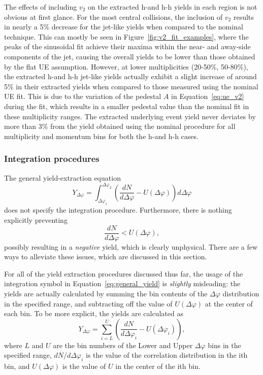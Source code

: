 The effects of including $v_{2}$ on the extracted h-\lmb and h-h yields in each region is not obvious at first glance. For the most central collisions, the inclusion of $v_{2}$ results in nearly a 5\% decrease for the jet-like yields when compared to the nominal technique. This can mostly be seen in Figure~\ref{fig:v2_fit_examples}, where the peaks of the sinusoidal fit achieve their maxima within the near- and away-side components of the jet, causing the overall yields to be lower than those obtained by the flat UE assumption. However, at lower multiplicities (20-50\%, 50-80\%), the extracted h-\lmb and h-h jet-like yields actually exhibit a slight increase of around 5\% in their extracted yields when compared to those measured using the nominal UE fit. This is due to the variation of the pedestal $A$ in Equation~\ref{eq:ue_v2} during the fit, which results in a smaller pedestal value than the nominal fit in these multiplicity ranges. The extracted underlying event yield never deviates by more than 3\% from the yield obtained using the nominal procedure for all multiplicity and momentum bins for both the h-\lmb and h-h cases.

\subsubsection{Integration procedures}
\label{sec:integration_procedures}

The general yield-extraction equation
%
\begin{equation}
    \label{eq:general_yield}
    Y_{\Delta\varphi} = \int_{\Delta\varphi_1}^{\Delta\varphi_2} (\frac{dN}{d\Delta\varphi}- U(\Delta\varphi))d\Delta\varphi
\end{equation}
%
does not specify the integration procedure. Furthermore, there is nothing explicitly preventing 
%
\begin{equation}
    \frac{dN}{d\Delta\varphi} < U(\Delta\varphi),
\end{equation}
%
possibly resulting in a \textit{negative} yield, which is clearly unphysical. There are a few ways to alleviate these issues, which are discussed in this section.

For all of the yield extraction procedures discussed thus far, the usage of the integration symbol in Equation~\ref{eq:general_yield} is \textit{slightly} misleading: the yields are actually calculated by summing the bin contents of the $\Delta\varphi$ distribution in the specified range, and subtracting off the value of $U(\Delta\varphi)$ at the center of each bin. To be more explicit, the yields are calculated as
%
\begin{equation}
    \label{eq:yield_sum}
    Y_{\Delta\varphi} = \sum_{i=L}^{U} (\frac{dN}{d\Delta\varphi_{i}}- U(\Delta\varphi_{i})),
\end{equation}
%
where $L$ and $U$ are the bin numbers of the Lower and Upper $\Delta\varphi$ bins in the specified range, $dN/d\Delta\varphi_{i}$ is the value of the correlation distribution in the ith \dphi bin, and $U(\Delta\varphi)$ is the value of $U$ in the center of the ith \dphi bin. 

